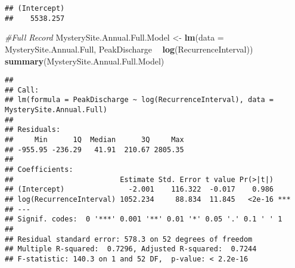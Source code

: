 \documentclass[]{article}
\newenvironment{Shaded}{\begin{snugshade}}{\end{snugshade}}
\newcommand{\CommentTok}[1]{\textcolor[rgb]{0.56,0.35,0.01}{\textit{#1}}}
\newcommand{\DataTypeTok}[1]{\textcolor[rgb]{0.13,0.29,0.53}{#1}}
\newcommand{\DecValTok}[1]{\textcolor[rgb]{0.00,0.00,0.81}{#1}}
\newcommand{\FloatTok}[1]{\textcolor[rgb]{0.00,0.00,0.81}{#1}}
\newcommand{\KeywordTok}[1]{\textcolor[rgb]{0.13,0.29,0.53}{\textbf{#1}}}
\newcommand{\NormalTok}[1]{#1}
\newcommand{\OperatorTok}[1]{\textcolor[rgb]{0.81,0.36,0.00}{\textbf{#1}}}
\newcommand{\StringTok}[1]{\textcolor[rgb]{0.31,0.60,0.02}{#1}}
\begin{document}
\begin{Shaded}
\end{Shaded}

\begin{verbatim}
## (Intercept) 
##    5538.257
\end{verbatim}

\begin{Shaded}
\begin{Highlighting}[]
\CommentTok{#Full Record}
\NormalTok{MysterySite.Annual.Full.Model <-}\StringTok{ }\KeywordTok{lm}\NormalTok{(}\DataTypeTok{data =}\NormalTok{ MysterySite.Annual.Full,}
\NormalTok{                                    PeakDischarge }\OperatorTok{~}\StringTok{ }\KeywordTok{log}\NormalTok{(RecurrenceInterval))}
\KeywordTok{summary}\NormalTok{(MysterySite.Annual.Full.Model)}
\end{Highlighting}
\end{Shaded}

\begin{verbatim}
## 
## Call:
## lm(formula = PeakDischarge ~ log(RecurrenceInterval), data = MysterySite.Annual.Full)
## 
## Residuals:
##     Min      1Q  Median      3Q     Max 
## -955.95 -236.29   41.91  210.67 2805.35 
## 
## Coefficients:
##                         Estimate Std. Error t value Pr(>|t|)    
## (Intercept)               -2.001    116.322  -0.017    0.986    
## log(RecurrenceInterval) 1052.234     88.834  11.845   <2e-16 ***
## ---
## Signif. codes:  0 '***' 0.001 '**' 0.01 '*' 0.05 '.' 0.1 ' ' 1
## 
## Residual standard error: 578.3 on 52 degrees of freedom
## Multiple R-squared:  0.7296, Adjusted R-squared:  0.7244 
## F-statistic: 140.3 on 1 and 52 DF,  p-value: < 2.2e-16
\end{verbatim}

\begin{Shaded}
\end{Shaded}
\end{document}
